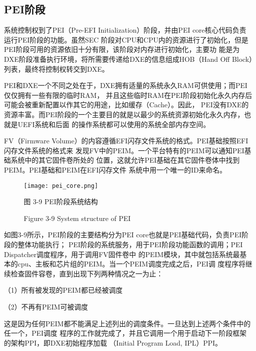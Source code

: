 \subsection{PEI阶段}
系统控制权到了PEI（Pre-EFI Initialization）阶段，并由PEI core核心代码负责运行PEI阶段的功能。虽然SEC
阶段对CPU和CPU内的资源进行了初始化，但是PEI阶段可用的资源依旧十分有限，该阶段对内存进行初始化，主要功
能是为DXE阶段准备执行环境，将所需要传递给DXE的信息组成HOB（Hand Off Block）列表，最终将控制权转交到DXE。
\par PEI和DXE一个不同之处在于，DXE拥有适量的系统永久RAM可供使用；而PEI仅仅拥有一些有限的临时RAM，
并且这些临时RAM在PEI阶段初始化永久内存后可能会被重新配置以作其它的用途，比如缓存（Cache）。因此，
PEI没有DXE的资源丰富。而PEI阶段的一个主要目的就是以最少的系统资源初始化永久内存，也就是UEFI系统和后面
的操作系统都可以使用的系统全部内存空间。
\par FV（Firmware Volume）的内容遵循EFI闪存文件系统的格式。PEI基础按照EFI闪存文件系统的格式来
发现FV中的PEIM。一个平台特有的PEIM可以通知PEI基础系统中的其它固件卷所处的
位置，这就允许PEI基础在其它固件卷体中找到PEIM。PEI基础和PEIM在EFI闪存文件
系统中用一个唯一的ID来命名。

\begin{figure}[htb]
    \label{ffs_format}
    \vspace{0cm}   
    \setlength{\abovecaptionskip}{0.3cm}
	\centering
    \texttt{[image: pei\_core.png]}
    \caption*{图 3-9 PEI阶段系统结构}
    \setlength{\belowcaptionskip}{-0.7cm}
    \caption*{Figure 3-9 System structure of PEI}
\end{figure}

如图3-9所示，PEI阶段的主要结构分为PEI core也就是PEI基础代码，负责PEI阶段的整体功能执行；
PEI阶段的系统服务，用于PEI阶段功能函数的调用；PEI Dispatcher调度程序，用于调用FV固件卷中
的PEIM模块，其中就包括系统最基本的cpu、主板和芯片组的PEIM。当一个PEIM调度完成之后，PEI调
度程序将继续检查固件容卷，直到出现下列两种情况之一为止：
\par （1）所有被发现的PEIM都已经被调度
\par （2）不再有PEIM可被调度
\par 这是因为任何PEIM都不能满足上述列出的调度条件。一旦达到上述两个条件中的任一个，PEI调度
程序的工作就完成了，并且它调用一个用于启动下一阶段框架的架构PPI，即DXE初始程序加载
（Initial Program Load, IPL）PPI。

